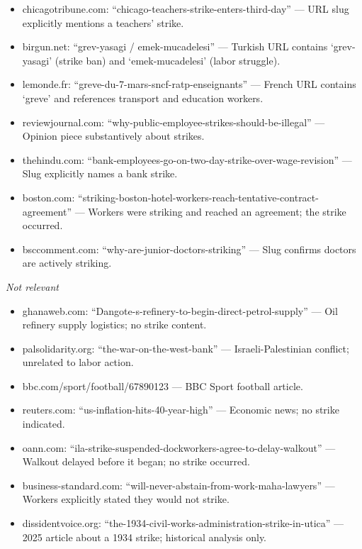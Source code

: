 \documentclass[
  11pt,
]{article}
\providecommand{\tightlist}{%
  \setlength{\itemsep}{0pt}\setlength{\parskip}{0pt}}
\begin{document}
\begin{itemize}
\tightlist
\item
  chicagotribune.com: ``chicago-teachers-strike-enters-third-day'' ---
  URL slug explicitly mentions a teachers' strike.
\item
  birgun.net: ``grev-yasagi / emek-mucadelesi'' --- Turkish URL contains
  `grev-yasagi' (strike ban) and `emek-mucadelesi' (labor struggle).
\item
  lemonde.fr: ``greve-du-7-mars-sncf-ratp-enseignants'' --- French URL
  contains `greve' and references transport and education workers.
\item
  reviewjournal.com: ``why-public-employee-strikes-should-be-illegal''
  --- Opinion piece substantively about strikes.
\item
  thehindu.com:
  ``bank-employees-go-on-two-day-strike-over-wage-revision'' --- Slug
  explicitly names a bank strike.
\item
  boston.com:
  ``striking-boston-hotel-workers-reach-tentative-contract-agreement''
  --- Workers were striking and reached an agreement; the strike
  occurred.
\item
  bsccomment.com: ``why-are-junior-doctors-striking'' --- Slug confirms
  doctors are actively striking.
\end{itemize}

\emph{Not relevant}

\begin{itemize}
\tightlist
\item
  ghanaweb.com: ``Dangote-s-refinery-to-begin-direct-petrol-supply'' ---
  Oil refinery supply logistics; no strike content.
\item
  palsolidarity.org: ``the-war-on-the-west-bank'' ---
  Israeli-Palestinian conflict; unrelated to labor action.
\item
  bbc.com/sport/football/67890123 --- BBC Sport football article.
\item
  reuters.com: ``us-inflation-hits-40-year-high'' --- Economic news; no
  strike indicated.
\item
  oann.com: ``ila-strike-suspended-dockworkers-agree-to-delay-walkout''
  --- Walkout delayed before it began; no strike occurred.
\item
  business-standard.com: ``will-never-abstain-from-work-maha-lawyers''
  --- Workers explicitly stated they would not strike.
\item
  dissidentvoice.org:
  ``the-1934-civil-works-administration-strike-in-utica'' --- 2025
  article about a 1934 strike; historical analysis only.
\end{itemize}
\end{document}
